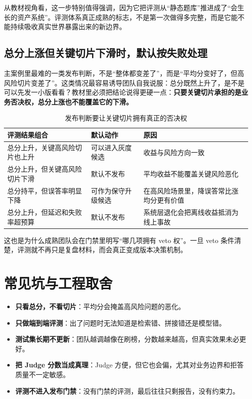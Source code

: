 从教材视角看，这一步特别值得强调，因为它把评测从“静态题库”推进成了“会生长的资产系统”。评测体系真正成熟的标志，不是第一次做得多完整，而是它能不能持续吸收真实世界暴露出来的新边界。

\subsection{总分上涨但关键切片下滑时，默认按失败处理}
主案例里最难的一类发布判断，不是“整体都变差了”，而是“平均分变好了，但高风险切片变差了”。这类情况最容易诱导团队自我说服：总分既然上升了，是不是可以先发一小版看看？教材里必须把结论说得更硬一点：\textbf{只要关键切片承担的是业务否决权，总分上涨也不能覆盖它的下滑。}

\begin{table}[H]
\centering
\small
\begin{tabularx}{\textwidth}{>{\raggedright\arraybackslash}p{3.2cm}>{\raggedright\arraybackslash}p{3cm}>{\raggedright\arraybackslash}X}
\toprule
\textbf{评测结果组合} & \textbf{默认动作} & \textbf{原因} \\
\midrule
总分上升，关键高风险切片也上升 & 可以进入灰度候选 & 收益与风险方向一致 \\
总分上升，但关键高风险切片下滑 & 默认不发布 & 平均收益不能覆盖关键风险恶化 \\
总分持平，但误答率明显下降 & 可作为保守升级候选 & 在高风险场景里，降误答常比涨均分更有价值 \\
总分上升，但延迟和失败率超预算 & 默认不发布 & 系统层退化会把离线收益抵消为线上事故 \\
\bottomrule
\end{tabularx}
\caption{发布判断要让关键切片拥有真正的否决权}
\label{tab:eval-release-decision}
\end{table}

这也是为什么成熟团队会在门禁里明写“哪几项拥有 veto 权”。一旦 veto 条件清楚，评测就不再只是复盘材料，而会真正变成版本决策机制。

\section{常见坑与工程取舍}
\begin{itemize}
  \item \textbf{只看总分，不看切片}：平均分会掩盖高风险问题的恶化。
  \item \textbf{只做端到端评测}：出了问题时无法知道是检索错、拼接错还是模型错。
  \item \textbf{测试集长期不更新}：团队越调越像在刷榜，分数越来越高，但真实效果未必更好。
  \item \textbf{把 Judge 分数当成真理}：Judge 方便，但它也会偏，尤其对业务边界和拒答质量不一定敏感。
  \item \textbf{评测不进入发布门禁}：没有门禁的评测，最后往往只剩报告，没有约束力。
\end{itemize}

